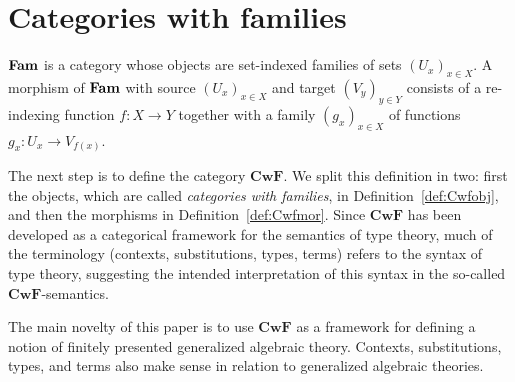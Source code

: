 \documentclass{mscs}
\def\Cwf{\mathbf{CwF}}
\begin{document}
\section{Categories with families}\label{sec:def_cwf}



\begin{definition}\label{def:catFam}
$\textbf{Fam}$ is a category whose objects are
set-indexed families of sets $(U_x)_{x\in X}$.
A morphism of $\textbf{Fam}$ with source $(U_x)_{x\in X}$ and target $(V_y)_{y\in Y}$
consists of a re-indexing function $f: X\to Y$ together with a family
$(g_x)_{x\in X}$ of functions $g_x : U_x \to V_{f(x)}$. %
\end{definition}

The next step is to define the category $\Cwf$.
We split this definition in two: first the objects,
which are called \emph{categories with families}, in Definition~\ref{def:Cwfobj},
and then the morphisms in Definition~\ref{def:Cwfmor}.
Since $\Cwf$ has been developed as a categorical framework for the semantics of
type theory, much of the terminology (contexts, substitutions,
types, terms) refers to the syntax of type theory,
suggesting the intended interpretation of this syntax in the
so-called $\Cwf$-semantics.

The main novelty of this paper is to use $\Cwf$ as a framework
for defining a notion of finitely presented generalized algebraic theory.
Contexts, substitutions, types, and terms also make
sense in relation to generalized algebraic theories.
\end{document}
